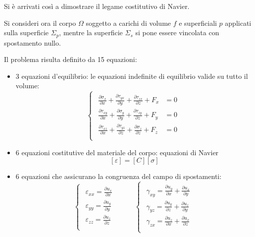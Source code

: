 \documentclass{article}
\begin{document}
\begin{adjustwidth}{2in}{}
	Si è arrivati così a dimostrare il legame costitutivo di Navier. \newline 
	
	Si consideri ora il corpo $\Omega$ soggetto a carichi di volume $ f $ e superficiali $ p $ applicati sulla
	superficie $ \Sigma_p $, mentre la superficie $ \Sigma_s $ si pone essere vincolata con spostamento nullo. \newline

	Il problema risulta definito da 15 equazioni:
	\begin{itemize}
		\item 3 equazioni d'equilibrio: le equazioni indefinite di equilibrio valide su tutto il volume:
				 \[
				\begin{cases}
					\begin{aligned}
					\frac{\partial\sigma_x}{\partial x} + \frac{\partial \tau_{yx}}{\partial y} + \frac{\partial \tau_{zx}}{\partial z} + F_x & =0 \\
		
					\frac{\partial \tau_{xy}}{\partial x} + \frac{\partial\sigma_y}{\partial y} + \frac{\partial \tau_{zy}}{\partial z} + F_y & =0 \\
		
					\frac{\partial \tau_{xz}}{\partial x} + \frac{\partial \tau_{yz}}{\partial z} + \frac{\partial\sigma_z}{\partial z} + F_z & =0 \\
					\end{aligned}
				\end{cases}
				\]
				
		\item 6 equazioni costitutive del materiale del corpo: equazioni di Navier
				\[ [\varepsilon] = [C][\sigma]\]
				
		\item 6 equazioni che assicurano la congruenza del campo di spostamenti: 
				\[ 
				\begin{cases}
					\begin{aligned}
						\varepsilon_{xx} =   \frac{\partial u_x}{\partial x} \\
						\varepsilon_{yy} =   \frac{\partial u_y}{\partial y} \\
						\varepsilon_{zz} =   \frac{\partial u_z}{\partial z} \\
					\end{aligned}
				\end{cases} \hspace{1cm} \begin{cases}
					\begin{aligned}
						\gamma_{xy} =   \frac{\partial u_y}{\partial x} + \frac{\partial u_x}{\partial y} \\
						\gamma_{yz} =   \frac{\partial u_y}{\partial z} + \frac{\partial u_z}{\partial y} \\
						\gamma_{zx} =   \frac{\partial u_z}{\partial x} + \frac{\partial u_x}{\partial z} \\
					\end{aligned}
				\end{cases}
				\]
				

\end{itemize}
\end{adjustwidth}
\end{document}
